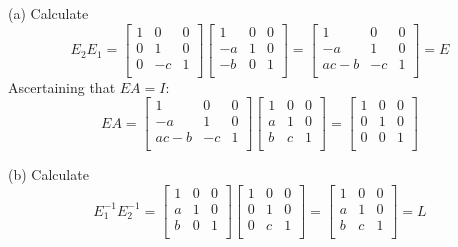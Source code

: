 \documentclass[a4paper]{article}
\begin{document}
(a) Calculate
\[
	E_{2}E_{1} = 
	\begin{bmatrix}
		1 & 0 & 0 \\
		0 & 1 & 0 \\
		0 & -c & 1 \\
	\end{bmatrix}
	\begin{bmatrix}
		1 & 0 & 0 \\
		-a & 1 & 0 \\
		-b & 0 & 1 \\
	\end{bmatrix}
	=
	\begin{bmatrix}
		1 & 0 & 0 \\
		-a & 1 & 0 \\
		ac - b & -c & 1 \\
	\end{bmatrix}
	= E
\]
Ascertaining that \(EA = I\):
\[
	EA = 
	\begin{bmatrix}
		1 & 0 & 0 \\
		-a & 1 & 0 \\
		ac - b & -c & 1 \\
	\end{bmatrix}
	\begin{bmatrix}
		1 & 0 & 0 \\
		a & 1 & 0 \\
		b & c & 1 \\
	\end{bmatrix}
	=
	\begin{bmatrix}
		1 & 0 & 0 \\
		0 & 1 & 0 \\
		0 & 0 & 1 \\
	\end{bmatrix}
\]

(b) Calculate
\[
	E_{1}^{-1}E_{2}^{-1} =
	\begin{bmatrix}
		1 & 0 & 0 \\
		a & 1 & 0 \\
		b & 0 & 1 \\
	\end{bmatrix}
	\begin{bmatrix}
		1 & 0 & 0 \\
		0 & 1 & 0 \\
		0 & c & 1 \\
	\end{bmatrix}
	=
	\begin{bmatrix}
		1 & 0 & 0 \\
		a & 1 & 0 \\
		b & c & 1 \\
	\end{bmatrix}
	= L
\]
\end{document}
